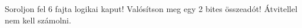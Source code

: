 \begin{example}

Soroljon fel 6 fajta logikai kaput! Valósítson meg egy 2 bites összeadót! Átvitellel nem kell számolni.

\tcbline
\vspace{1mm}

\solution

\end{example}